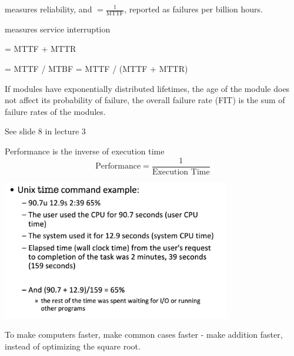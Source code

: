\documentclass[12pt]{scrartcl}
\begin{document}
\begin{definition}
   measures reliability, and  $ = \frac{1}{\text{MTTF}}$, 
  reported as failures per billion hours. 

   measures service interruption

   = MTTF + MTTR

   = MTTF / MTBF = MTTF / (MTTF + MTTR)
\end{definition}

\begin{note}
  If modules have exponentially distributed lifetimes, the age of the module does not affect 
  its probability of failure, the overall failure rate (FIT) is the sum of failure rates of the modules. 
\end{note}

\begin{example}
  See slide 8 in lecture 3 
\end{example}

\begin{definition}[Performance]
  Performance is the inverse of execution time 
  \[\text{Performance} = \frac{1}{\text{Execution Time}}\]
\end{definition}

\begin{center}
  \begin{example}
    \includegraphics[width=10cm]{time.png}
  \end{example}
\end{center}

\begin{note}
  To make computers faster, make common cases faster - make addition faster, instead of optimizing the square root. 
\end{note}
\end{document}
